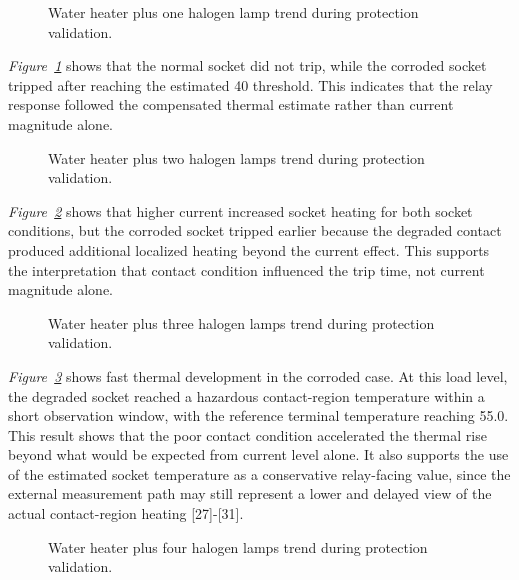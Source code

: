 \begin{figure}[H]
  \centering
  \caption{Water heater plus one halogen lamp trend during protection validation.}
  \label{fig:ch4-protect-one-lamp}
\end{figure}

\textit{Figure~\ref{fig:ch4-protect-one-lamp}} shows that the normal socket did
not trip, while the corroded socket tripped after reaching the estimated
40{\degreeC} threshold. This indicates that the relay response followed the
compensated thermal estimate rather than current magnitude alone.

\begin{figure}[H]
  \centering
  \caption{Water heater plus two halogen lamps trend during protection validation.}
  \label{fig:ch4-protect-two-lamps}
\end{figure}

\textit{Figure~\ref{fig:ch4-protect-two-lamps}} shows that higher current
increased socket heating for both socket conditions, but the corroded socket
tripped earlier because the degraded contact produced additional localized
heating beyond the current effect. This supports the interpretation that contact
condition influenced the trip time, not current magnitude alone.

\begin{figure}[H]
  \centering
  \caption{Water heater plus three halogen lamps trend during protection validation.}
  \label{fig:ch4-protect-three-lamps}
\end{figure}

\textit{Figure~\ref{fig:ch4-protect-three-lamps}} shows fast thermal
development in the corroded case. At this load level, the degraded socket
reached a hazardous contact-region temperature within a short observation
window, with the reference terminal temperature reaching 55.0{\degreeC}. This
result shows that the poor contact condition accelerated the thermal rise beyond
what would be expected from current level alone. It also supports the use of the
estimated socket temperature as a conservative relay-facing value, since the
external measurement path may still represent a lower and delayed view of the
actual contact-region heating [27]-[31].

\begin{figure}[H]
  \centering
  \caption{Water heater plus four halogen lamps trend during protection validation.}
  \label{fig:ch4-protect-four-lamps}
\end{figure}

